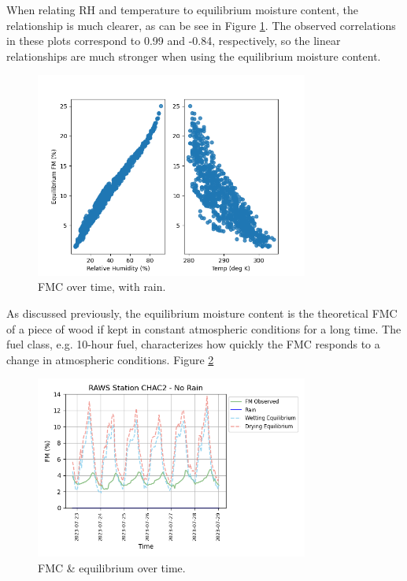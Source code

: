 \documentclass[11pt]{article}%
\begin{document}
When relating RH and temperature to equilibrium moisture content, the relationship is much clearer, as can be see in Figure \ref{fig:ep_rh_temp_plot}. The observed correlations in these plots correspond to 0.99 and -0.84, respectively, so the linear relationships are much stronger when using the equilibrium moisture content.

\begin{figure}[ht]
    \centering
    \includegraphics[width=0.8\textwidth]{images/eq_rh_temp_plot.png}
    \caption{FMC over time, with rain.}
    \label{fig:ep_rh_temp_plot}
\end{figure}

As discussed previously, the equilibrium moisture content is the theoretical FMC of a piece of wood if kept in constant atmospheric conditions for a long time. The fuel class, e.g. 10-hour fuel, characterizes how quickly the FMC responds to a change in atmospheric conditions. Figure \ref{fig:eq_plot}

\begin{figure}[ht]
    \centering
    \includegraphics[width=0.8\textwidth]{images/eq_plot.png}
    \caption{FMC \& equilibrium over time.}
    \label{fig:eq_plot}
\end{figure}
\end{document}
